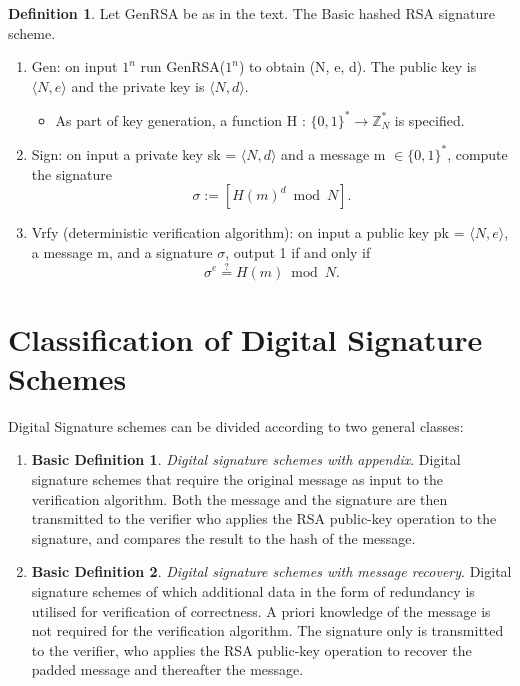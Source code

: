 \documentclass[]{final_report}
\theoremstyle{definition}
\newtheorem{definition}{Definition}[chapter]
\newtheorem{basic}{Basic Definition}
\begin{document}
\begin{definition}
\label{def:hashed rsa}
Let GenRSA be as in the text. The Basic hashed RSA signature scheme.
\begin{mdframed}
\begin{enumerate}
    \item Gen: on input $1^n$ run GenRSA($1^n$) to obtain (N, e, d). The public key is $\langle N, e \rangle$ and the private key is $\langle N, d \rangle$.
    \begin{itemize}
    \item As part of key generation, a function H : $\{0, 1\}^* \rightarrow \mathbb{Z}^*_{N}$ is specified.
    \end{itemize}

    \item Sign: on input a private key sk = $\langle N, d \rangle$ and a message m $\in \{0, 1\}^*$, compute the signature
\[\sigma := [H(m)^d \bmod N].\]
    \item Vrfy (deterministic verification algorithm):  on input a public key pk = $\langle N, e \rangle$, a message m, and a signature $\sigma$, output 1 if and only if
    \[\sigma^e \stackrel{?}{=} H(m) \bmod N.\]
\end{enumerate}
\end{mdframed}

\end{definition}

\section{Classification of Digital Signature Schemes}
Digital Signature schemes can be divided according to two general classes:
\begin{enumerate}
    \item[] \begin{basic} 
\textit{Digital signature schemes with appendix}. Digital signature schemes that require the original message as input to the verification algorithm. Both the message and the signature are then transmitted to the verifier who applies the RSA public-key operation to the signature, and compares the result to the hash of the message.
\end{basic}
    \item[] \begin{basic}
\textit{Digital signature schemes with message recovery}. Digital signature schemes of which additional data in the form of redundancy is utilised for verification of correctness. A priori knowledge of the message is not required for the verification algorithm. The signature only is transmitted to the verifier, who applies the RSA public-key operation to recover the padded message and thereafter the message. 
\end{basic}

\end{enumerate}
\end{document}
